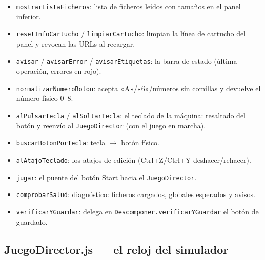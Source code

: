 \documentclass[../main.tex]{subfiles}
\begin{document}
\begin{itemize}
	máquina.
	\item \texttt{mostrarListaFicheros}: lista de ficheros leídos con
	tamaños en el panel inferior.
	\item \texttt{resetInfoCartucho} / \texttt{limpiarCartucho}: limpian
	la línea de cartucho del panel y revocan las URLs al recargar.
	\item \texttt{avisar} / \texttt{avisarError} / \texttt{avisarEtiquetas}:
	la barra de estado (última operación, errores en rojo).
	\item \texttt{normalizarNumeroBoton}: acepta «A»/«6»/números sin
	comillas y devuelve el número físico 0--8.
	\item \texttt{alPulsarTecla} / \texttt{alSoltarTecla}: el teclado de
	la máquina: resaltado del botón y reenvío al \texttt{JuegoDirector}
	(con el juego en marcha).
	\item \texttt{buscarBotonPorTecla}: tecla $\rightarrow$ botón físico.
	\item \texttt{alAtajoTeclado}: los atajos de edición
	(Ctrl+Z/Ctrl+Y deshacer/rehacer).
	\item \texttt{jugar}: el puente del botón Start hacia el
	\texttt{JuegoDirector}.
	\item \texttt{comprobarSalud}: diagnóstico: ficheros cargados,
	globales esperados y avisos.
	\item \texttt{verificarYGuardar}: delega en
	\texttt{Descomponer.verificarYGuardar} el botón de guardado.
\end{itemize}

\subsection*{JuegoDirector.js — el reloj del simulador}
\end{document}
